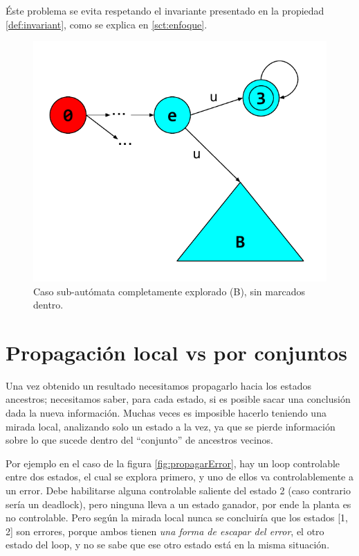 Éste problema se evita respetando el invariante presentado en la propiedad \ref{def:invariant}, como se explica en \ref{sct:enfoque}.

\begin{figure}[htb]
	\centering
	\includegraphics[width=\linewidth/2]{figures/FalenciasErrores.pdf}
	\caption{Caso sub-autómata completamente explorado (B), sin marcados dentro.}
	\label{fig:falenciasErrores}
\end{figure}

\section{Propagación local vs por conjuntos}\label{propagacionLocal}

Una vez obtenido un resultado necesitamos propagarlo hacia los estados ancestros; necesitamos saber, para cada estado, si es posible sacar una conclusión dada la nueva información. Muchas veces es imposible hacerlo teniendo una mirada local, analizando solo un estado a la vez, ya que se pierde información sobre lo que sucede dentro del ``conjunto'' de ancestros vecinos.

Por ejemplo en el caso de la figura \ref{fig:propagarError}, hay un loop controlable entre dos estados, el cual se explora primero, y uno de ellos va controlablemente a un error. Debe habilitarse alguna controlable saliente del estado 2 (caso contrario sería un deadlock), pero ninguna lleva a un estado ganador, por ende la planta es no controlable. Pero según la mirada local nunca se concluiría que los estados [1, 2] son errores, porque ambos tienen \textit{una forma de escapar del error}, el otro estado del loop, y no se sabe que ese otro estado está en la misma situación. 

